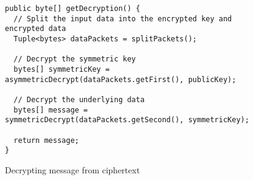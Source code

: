 \begin{figure}[H]
  \centering
  \begin{verbatim}
public byte[] getDecryption() {
  // Split the input data into the encrypted key and encrypted data
  Tuple<bytes> dataPackets = splitPackets();

  // Decrypt the symmetric key
  bytes[] symmetricKey = asymmetricDecrypt(dataPackets.getFirst(), publicKey);

  // Decrypt the underlying data
  bytes[] message = symmetricDecrypt(dataPackets.getSecond(), symmetricKey);

  return message;
}
  \end{verbatim}
  \caption{Decrypting message from ciphertext}
  \label{code:decrypt_data}
\end{figure}
